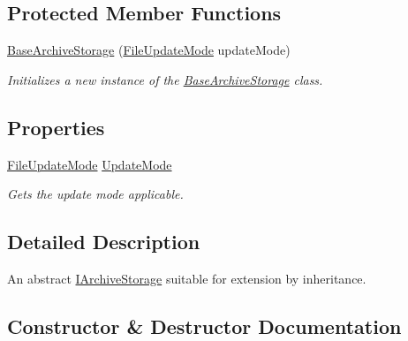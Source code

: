 \subsection*{Protected Member Functions}
\begin{DoxyCompactItemize}
\item 
\hyperlink{class_i_c_sharp_code_1_1_sharp_zip_lib_1_1_zip_1_1_base_archive_storage_a9947ee072d6d28984862f7790ee417b1}{Base\+Archive\+Storage} (\hyperlink{namespace_i_c_sharp_code_1_1_sharp_zip_lib_1_1_zip_a626313bc452203ca2bdb092947541027}{File\+Update\+Mode} update\+Mode)
\begin{DoxyCompactList}\small\item\em Initializes a new instance of the \hyperlink{class_i_c_sharp_code_1_1_sharp_zip_lib_1_1_zip_1_1_base_archive_storage}{Base\+Archive\+Storage} class. \end{DoxyCompactList}\end{DoxyCompactItemize}
\subsection*{Properties}
\begin{DoxyCompactItemize}
\item 
\hyperlink{namespace_i_c_sharp_code_1_1_sharp_zip_lib_1_1_zip_a626313bc452203ca2bdb092947541027}{File\+Update\+Mode} \hyperlink{class_i_c_sharp_code_1_1_sharp_zip_lib_1_1_zip_1_1_base_archive_storage_a7cf854d56eeb0f854e4cad9375ac4527}{Update\+Mode}
\begin{DoxyCompactList}\small\item\em Gets the update mode applicable. \end{DoxyCompactList}\end{DoxyCompactItemize}


\subsection{Detailed Description}
An abstract \hyperlink{interface_i_c_sharp_code_1_1_sharp_zip_lib_1_1_zip_1_1_i_archive_storage}{I\+Archive\+Storage} suitable for extension by inheritance. 



\subsection{Constructor \& Destructor Documentation}
\mbox{\label{class_i_c_sharp_code_1_1_sharp_zip_lib_1_1_zip_1_1_base_archive_storage_a9947ee072d6d28984862f7790ee417b1}} 
